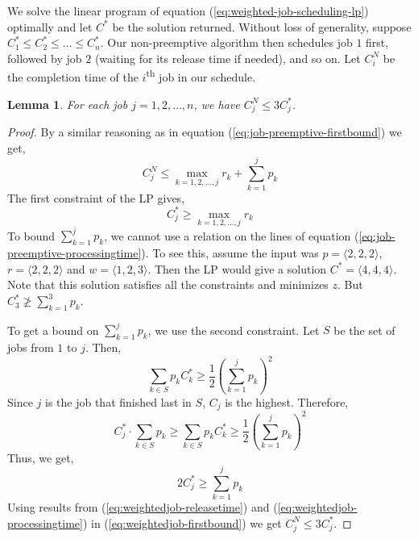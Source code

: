 \documentclass[10pt]{article}
\newtheorem{lemma}[theorem]{Lemma}
\numberwithin{equation}{section}
\begin{document}
We solve the linear program of equation (\ref{eq:weighted-job-scheduling-lp})  optimally and let $C^*$ be the solution returned. Without loss of generality, suppose $C_1^* \leq C_2^* \leq \ldots \leq C_n^*$. Our non-preemptive algorithm then schedules job $1$ first, followed by job $2$ (waiting for its release time if needed), and so on. Let $C_i^N$ be the completion time of the $i$\textsuperscript{th} job in our schedule.

\begin{lemma}
For each job $j = 1, 2, \ldots, n$, we have $C_j^N \leq 3C_j^*$.
\end{lemma}
\begin{proof}
By a similar reasoning as in equation (\ref{eq:job-preemptive-firstbound}) we get,
\begin{equation}\label{eq:weightedjob-firstbound}
C_j^N \leq \max_{k = 1, 2, \ldots, j}r_k + \sum_{k = 1}^j p_k
\end{equation}
The first constraint of the LP gives,
\begin{equation}\label{eq:weightedjob-releasetime}
C_j^* \geq \max_{k = 1, 2, \ldots, j}r_k
\end{equation}
To bound $\sum_{k = 1}^j p_k$, we cannot use a relation on the lines of equation (\ref{eq:job-preemptive-processingtime}). To see this, assume the input was $p = \langle 2, 2, 2 \rangle$, $r = \langle 2, 2, 2 \rangle$ and $w = \langle 1, 2, 3 \rangle$. Then the LP would give a solution $C^* = \langle 4, 4, 4 \rangle$. Note that this solution satisfies all the constraints and minimizes $z$. But $C_3^* \ngeq \sum_{k = 1}^3 p_k$.

To get a bound on $\sum_{k = 1}^j p_k$, we use the second constraint. Let $S$ be the set of jobs from $1$ to $j$. Then,
\begin{equation*}
\sum_{k \in S}p_kC_k^* \geq \frac{1}{2}(\sum_{k = 1}^j p_k)^2
\end{equation*}
Since $j$ is the job that finished last in $S$, $C_j$ is the highest. Therefore,
\begin{equation*}
C_j^* \cdot \sum_{k \in S}p_k \geq \sum_{k \in S}p_kC_k^* \geq \frac{1}{2}(\sum_{k = 1}^j p_k)^2
\end{equation*}
Thus, we get,
\begin{equation}\label{eq:weightedjob-processingtime}
2C_j^* \geq \sum_{k = 1}^j p_k
\end{equation}
Using results from (\ref{eq:weightedjob-releasetime}) and (\ref{eq:weightedjob-processingtime}) in (\ref{eq:weightedjob-firstbound}) we get $C_j^N \leq 3C_j^*$.
\end{proof}
\bigskip
\end{document}
